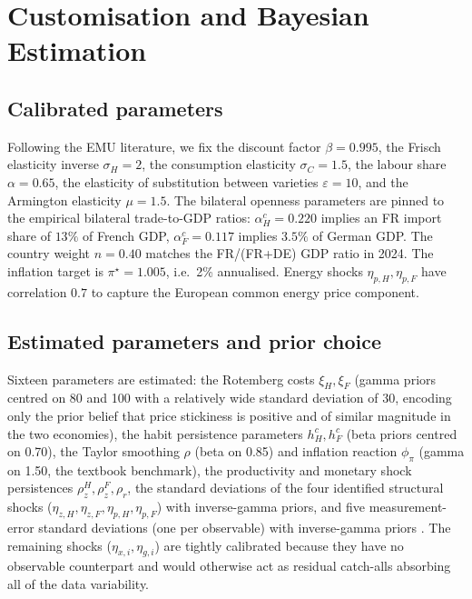 \documentclass[11pt,a4paper]{article}
\begin{document}
\section{Customisation and Bayesian Estimation}
\subsection{Calibrated parameters}
Following the EMU literature, we fix the discount factor
$\beta = 0.995$, the Frisch elasticity inverse $\sigma_H = 2$,
the consumption elasticity $\sigma_C = 1.5$, the labour share
$\alpha = 0.65$, the elasticity of substitution between varieties
$\varepsilon = 10$, and the Armington elasticity $\mu = 1.5$. The
bilateral openness parameters are pinned to the empirical bilateral
trade-to-GDP ratios: $\alpha^c_H = 0.220$ implies an FR import share
of $13\%$ of French GDP, $\alpha^c_F = 0.117$ implies $3.5\%$ of
German GDP. The country weight $n = 0.40$ matches the FR/(FR+DE) GDP
ratio in 2024. The inflation target is $\pi^{\star} = 1.005$, i.e.\
2\% annualised. Energy shocks $\eta_{p,H}, \eta_{p,F}$ have correlation
$0.7$ to capture the European common energy price component.

\subsection{Estimated parameters and prior choice}
Sixteen parameters are estimated: the Rotemberg costs $\xi_H, \xi_F$
(gamma priors centred on 80 and 100 with a relatively wide standard
deviation of 30, encoding only the prior belief that price stickiness
is positive and of similar magnitude in the two economies), the habit
persistence parameters $h^c_H, h^c_F$ (beta priors centred on 0.70),
the Taylor smoothing $\rho$ (beta on 0.85) and inflation reaction
$\phi_\pi$ (gamma on 1.50, the textbook \citet{TaylorRule1993}
benchmark), the productivity and monetary shock persistences
$\rho_z^H, \rho_z^F, \rho_r$, the standard deviations of the four
identified structural shocks ($\eta_{z,H}, \eta_{z,F}, \eta_{p,H},
\eta_{p,F}$) with inverse-gamma priors, and five measurement-error
standard deviations (one per observable) with inverse-gamma priors
\citep{SmetsWouters2007}. The remaining shocks ($\eta_{x,i},
\eta_{g,i}$) are tightly calibrated because they have no observable
counterpart and would otherwise act as residual catch-alls absorbing
all of the data variability.
\end{document}
